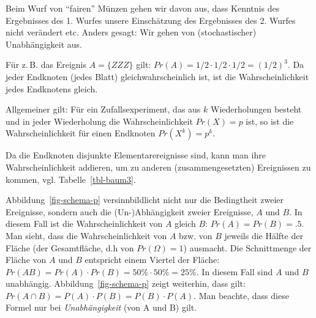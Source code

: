 \documentclass[
  ngerman,
  letterpaper,
  twoside,
  open=any]{scrbook}
\theoremstyle{definition}
\theoremstyle{plain}
\theoremstyle{definition}
\theoremstyle{definition}
\theoremstyle{definition}
\theoremstyle{definition}
\theoremstyle{remark}
\begin{document}
Beim Wurf von \enquote{fairen} Münzen gehen wir davon aus, dass Kenntnis
des Ergebnisses des 1. Wurfes unsere Einschätzung des Ergebnisses des 2.
Wurfes nicht verändert etc. Anders gesagt: Wir gehen von
(stochastischer) Unabhängigkeit aus.

Für z.\,B. das Ereignis \(A=\{ZZZ\}\) gilt:
\(Pr(A) = 1/2 \cdot 1/2 \cdot 1/2 = (1/2)^3\). Da jeder Endknoten (jedes
Blatt) gleichwahrscheinlich ist, ist die Wahrscheinlichkeit jedes
Endknotens gleich.

Allgemeiner gilt: Für ein Zufallsexperiment, das aus \(k\)
Wiederholungen besteht und in jeder Wiederholung die Wahrscheinlichkeit
\(Pr(X)=p\) ist, so ist die Wahrscheinlichkeit für einen Endknoten
\(Pr(X^k)=p^k\).

\begin{table}

\caption{\label{tbl-baum3}Ausgewählte Wahrscheinlichkeiten von
Ereignissen im dreifachen Münzwurf}


\end{table}%

Da die Endknoten disjunkte Elementarereignisse sind, kann man ihre
Wahrscheinlichkeit addieren, um zu anderen (zusammengesetzten)
Ereignissen zu kommen, vgl. Tabelle~\ref{tbl-baum3}.

Abbildung~\ref{fig-schema-p} versinnbildlicht nicht nur die Bedingtheit
zweier Ereignisse, sondern auch die (Un-)Abhängigkeit zweier Ereignisse,
\(A\) und \(B\). In diesem Fall ist die Wahrscheinlichkeit von \(A\)
gleich \(B\): \(Pr(A)=Pr(B)=.5\). Man sieht, dass die Wahrscheinlichkeit
von \(A\) bzw. von \(B\) jeweils die Hälfte der Fläche (der
Gesamtfläche, d.h von \(Pr(\Omega)=1\)) ausmacht. Die Schnittmenge der
Fläche von \(A\) und \(B\) entspricht einem Viertel der Fläche:
\(Pr(AB) = Pr(A) \cdot Pr(B) = 50\% \cdot 50\% = 25\%.\) In diesem Fall
sind \(A\) und \(B\) unabhängig. Abbildung~\ref{fig-schema-p} zeigt
weiterhin, dass gilt:
\(Pr(A\cap B) = P(A) \cdot P(B) = P(B) \cdot P(A)\). Man beachte, dass
diese Formel nur bei \emph{Unabhängigkeit} (von A und B) gilt.
\end{document}
